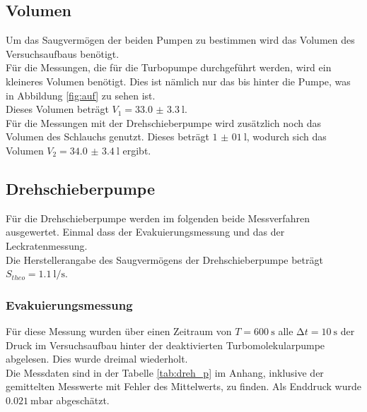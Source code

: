       \subsection{Volumen}
        Um das Saugvermögen der beiden Pumpen zu bestimmen wird das Volumen des Versuchsaufbaus benötigt.\\
        Für die Messungen, die für die Turbopumpe durchgeführt werden, wird ein kleineres Volumen benötigt.
        Dies ist nämlich nur das bis hinter die Pumpe, 
        was in Abbildung \ref{fig:auf} zu sehen ist.\\
        Dieses Volumen beträgt $V_1 = \SI{33.0(33)}{\litre}$.\\
        Für die Messungen mit der Drehschieberpumpe wird zusätzlich noch das Volumen des Schlauchs genutzt. 
        Dieses beträgt $\SI{1(01)}{\litre}$, wodurch sich das Volumen $V_2 = \SI{34.0(34)}{\litre}$ ergibt.\\



      \subsection{Drehschieberpumpe}

        \noindent Für die Drehschieberpumpe werden im folgenden beide Messverfahren ausgewertet. Einmal dass der Evakuierungsmessung und das der Leckratenmessung.\\
        Die Herstellerangabe des Saugvermögens der Drehschieberpumpe beträgt $ S_{theo} = \SI{1.1}{\litre\per\second}$.

        \subsubsection{Evakuierungsmessung}

        \noindent Für diese Messung wurden über einen Zeitraum von $ T = \SI{600}{\second}$ alle $ \increment t = \SI{10}{\second}$
        der Druck im Versuchsaufbau hinter der deaktivierten Turbomolekularpumpe abgelesen. Dies wurde dreimal wiederholt.\\
        Die Messdaten sind in der Tabelle \ref{tab:dreh_p} im Anhang, inklusive der gemittelten Messwerte mit Fehler des Mittelwerts, zu finden.
        Als Enddruck wurde $\SI{0.021}{\milli\bar}$ abgeschätzt.\\\\
        
